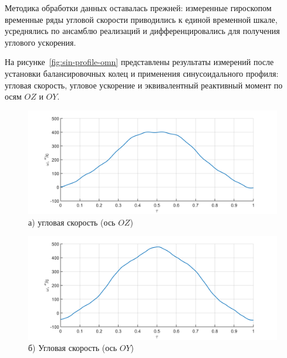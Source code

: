 Методика обработки данных оставалась прежней: измеренные гироскопом временные ряды угловой скорости приводились к единой временной шкале, усреднялись по ансамблю реализаций и дифференцировались для получения углового ускорения.

На рисунке~\cref{fig:sin-profile-omn} представлены результаты измерений после установки балансировочных колец и применения синусоидального профиля: угловая скорость, угловое ускорение и эквивалентный реактивный момент по осям $OZ$ и $OY$.

\begin{figure}[h!]
	\begin{minipage}[b]{0.49\linewidth}\centering
		\includegraphics[width=\linewidth]{matlab/img/oz-gyro-sin-vel} \\ а) угловая скорость (ось $OZ$)
	\end{minipage}
	\hfill
	\begin{minipage}[b]{0.49\linewidth}\centering
		\includegraphics[width=\linewidth]{matlab/img/oy-gyro-sin-vel} \\ б) Угловая скорость (ось $OY$)
	\end{minipage}
	
	\vspace{0.5em} %
	

\end{figure}
